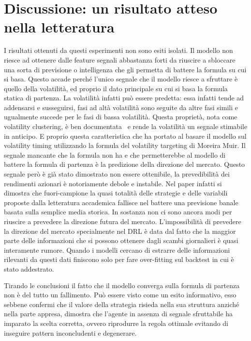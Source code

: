 \section{Discussione: un risultato atteso nella letteratura}


I risultati ottenuti da questi esperimenti non sono esiti isolati. 
Il modello non riesce ad ottenere dalle feature segnali abbastanza forti da riuscire 
a sbloccare una sorta di previsione o intelligenza che gli permetta di battere 
la formula su cui si basa.
Questo accade perché l'unico segnale che il modello riesce a sfruttare è quello della volatilità,
ed proprio il dato principale su cui si basa la formula statica di partenza.
La volatilità infatti può essere predetta: essa infatti tende ad addensarsi e susseguirsi, fasi ad altà volatilità sono seguite da altre fasi simili
e ugualmente succede per le fasi di bassa volatilità. Questa proprietà, nota come volatility clustering, è ben documentata~\citep{engle1982arch} e rende la volatilità un segnale stimabile
in anticipo.
E proprio questa caratteristica che ha portato al basare il modello sul volatility timing utilizzando la formula del volatility targeting di Moreira Muir.
Il segnale mancante che la formula non ha e che permetterebbe al modello di battere la formula di partenza
è la predizione della direzione del mercato. 
Questo segnale però è già stato dimostrato non essere ottenibile, la prevedibilità dei rendimenti azionari è notoriamente debole e instabile.
Nel paper \citet{goyal2024comprehensive} infatti si dimostra che fuori-campione la quasi totalità
delle strategie e delle variabili proposte dalla letteratura accademica fallisce nel battere 
una previsione banale basata sulla semplice media storica. In sostanza non ci sono ancora
modi per riuscire a prevedere la direzione futura del mercato. 
L'impossibilità di prevedere la direzione del mercato specialmente nel DRL è data dal fatto che la maggior parte 
delle informazioni che si possono ottenere dagli scambi giornalieri è quasi interamente rumore. Quando i modelli cercano di estrarre delle 
informazioni rilevanti da questi dati finiscono solo per fare over-fitting sul backtest in cui è stato addestrato.

Tirando le conclusioni il fatto che il modello converga sulla formula di partenza non è del tutto un fallimento.
Può essere visto come un esito informativo, esso sebbene confermi che il valore della strategia risieda nella sua struttura 
anziché nella parte appresa, dimostra che l'agente in assenza di segnale sfruttabile ha imparato la scelta corretta, ovvero riprodurre la regola ottimale 
evitando di inseguire pattern inconcludenti e degenerare.



